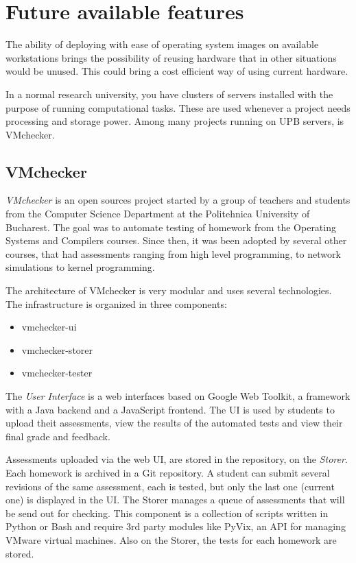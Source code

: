 
\chapter{Future available features}\label{ch:future}
\bigskip

The ability of deploying with ease of operating system images on
available workstations brings the possibility of reusing hardware that
in other situations would be unused. This could bring a cost efficient
way of using current hardware.

In a normal research university, you have clusters of servers installed
with the purpose of running computational tasks. These are used whenever
a project needs processing and storage power. Among many projects
running on UPB servers, is VMchecker.

\section{VMchecker}

\emph{VMchecker} is an open sources project started by a group of
teachers and students from the Computer Science Department at the
Politehnica University of Bucharest. The goal was to automate testing of
homework from the Operating Systems and Compilers courses. Since then,
it was been adopted by several other courses, that had assessments
ranging from high level programming, to network simulations to kernel
programming.

The architecture of VMchecker is very modular and uses several
technologies. The infrastructure is organized in three components:
\begin{itemize}
\item vmchecker-ui
\item vmchecker-storer
\item vmchecker-tester
\end{itemize}

The \emph{User Interface} is a web interfaces based on Google Web Toolkit,
a framework with a Java backend and a JavaScript frontend. The UI is used
by students to upload theit assessments, view the results of the automated
tests and view their final grade and feedback.

Assessments uploaded via the web UI, are stored in the repository, on the
\emph{Storer}. Each homework is archived in a Git repository. A student can
submit several revisions of the same assessment, each is tested, but only
the last one (current one) is displayed in the UI. The Storer manages a
queue of assessments that will be send out for checking. This component is
a collection of scripts written in Python or Bash and require 3rd party
modules like PyVix, an API for managing VMware virtual machines. Also on
the Storer, the tests for each homework are stored.

